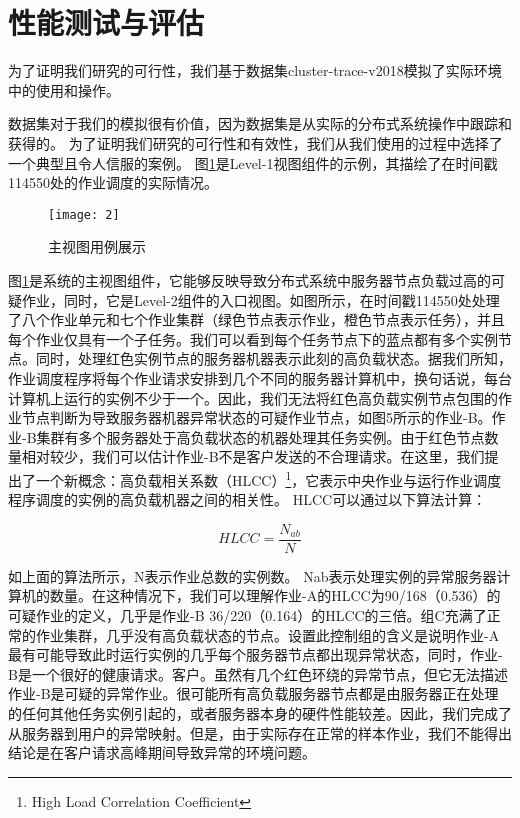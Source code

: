 \section{性能测试与评估}

为了证明我们研究的可行性，我们基于数据集cluster-trace-v2018模拟了实际环境中的使用和操作。

数据集对于我们的模拟很有价值，因为数据集是从实际的分布式系统操作中跟踪和获得的。 为了证明我们研究的可行性和有效性，我们从我们使用的过程中选择了一个典型且令人信服的案例。 图\ref{fig-6}是Level-1视图组件的示例，其描绘了在时间戳114550处的作业调度的实际情况。

\begin{figure}[h]
	\centering
	\texttt{[image: 2]}
	\caption{主视图用例展示}
	\label{fig-6}
\end{figure}

图\ref{fig-6}是系统的主视图组件，它能够反映导致分布式系统中服务器节点负载过高的可疑作业，同时，它是Level-2组件的入口视图。如图所示，在时间戳114550处处理了八个作业单元和七个作业集群（绿色节点表示作业，橙色节点表示任务），并且每个作业仅具有一个子任务。我们可以看到每个任务节点下的蓝点都有多个实例节点。同时，处理红色实例节点的服务器机器表示此刻的高负载状态。据我们所知，作业调度程序将每个作业请求安排到几个不同的服务器计算机中，换句话说，每台计算机上运行的实例不少于一个。因此，我们无法将红色高负载实例节点包围的作业节点判断为导致服务器机器异常状态的可疑作业节点，如图5所示的作业-B。作业-B集群有多个服务器处于高负载状态的机器处理其任务实例。由于红色节点数量相对较少，我们可以估计作业-B不是客户发送的不合理请求。在这里，我们提出了一个新概念：高负载相关系数（HLCC）\footnote{High Load Correlation Coefficient}，它表示中央作业与运行作业调度程序调度的实例的高负载机器之间的相关性。 HLCC可以通过以下算法计算：

$$HLCC=\frac{N_{ab}}{N}$$

如上面的算法所示，N表示作业总数的实例数。 Nab表示处理实例的异常服务器计算机的数量。在这种情况下，我们可以理解作业-A的HLCC为90/168（0.536）的可疑作业的定义，几乎是作业-B 36/220（0.164）的HLCC的三倍。组C充满了正常的作业集群，几乎没有高负载状态的节点。设置此控制组的含义是说明作业-A最有可能导致此时运行实例的几乎每个服务器节点都出现异常状态，同时，作业-B是一个很好的健康请求。客户。虽然有几个红色环绕的异常节点，但它无法描述作业-B是可疑的异常作业。很可能所有高负载服务器节点都是由服务器正在处理的任何其他任务实例引起的，或者服务器本身的硬件性能较差。因此，我们完成了从服务器到用户的异常映射。但是，由于实际存在正常的样本作业，我们不能得出结论是在客户请求高峰期间导致异常的环境问题。

